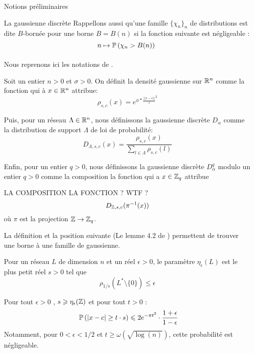 \begin{section}{Notions préliminaires}
\begin{subsection}{La gaussienne discrète}
	Rappellons aussi qu'une famille $\{\chi_n\}_n$ de distributions est dite $B$-bornée pour une borne $B = B(n)$ si la fonction suivante est négligeable :
		\[n \mapsto \PP\left(\chi_n > B(n)\right) \]

	\paragraph{}
	Nous reprenons ici les notations de \cite{STOC:GenPeiVai08}.

	Soit un entier $n > 0$  et $\sigma > 0$. On définit la densité gaussienne sur $\mathbb{R}^n$ comme la fonction qui à $x\in\mathbb{R}^n$ attribue:
	\[\rho_{s,c}(x) = e^{\phi * {\frac{||x-c||}{s}}^2} \]

	Puis, pour un réseau $\Lambda \in \mathbb{R}^n$, nous définissons la gaussienne discrète $D_\alpha$ comme la distribution de support $\Lambda$ de loi de probabilité: 	
	\[ D_{\Lambda, s, c}(x) = \frac{\rho_{s,c}(x)}{\sum_{l\in \Lambda}\rho_{s,c}(l)}\]

	Enfin, pour un entier $q > 0$, nous définissons la gaussienne discrète $D^q_{\alpha}$ modulo un entier $q > 0$ comme la composition la fonction qui a $x \in \mathbb{Z}_q$ attribue 
	
	LA COMPOSITION LA FONCTION ? WTF ?  
		\[ D_{\mathbb{Z}, s, c}(\pi^{-1}(x)) \]
	où $\pi$ est la projection $\mathbb{Z} \rightarrow \mathbb{Z}_q$.

La définition et la position suivante (Le lemme 4.2 de \cite{STOC:GenPeiVai08}) permettent de trouver une borne à une famille de gaussienne.
\begin{definition}
Pour un réseau $L$ de dimension $n$ et un réel $\epsilon > 0$, le paramètre $\eta_\epsilon(L)$ est le plus petit réel $s>0$ tel que 
	\[\rho_{1/s}(L^* \setminus \{0\}) \leqslant \epsilon\]
\end{definition}
	\begin{prop}
	Pour tout $\epsilon > 0$ , $s \geqslant \eta_{\epsilon}(\mathbb{Z})$ et pour tout $t>0$ :
	\[ \PP\left(|x-c| \geq t\cdot s\right) \leqslant 2 e^{-\pi t^2}	\cdot \frac{1+\epsilon}{1-\epsilon} \]
	Notamment, pour $0 < \epsilon  < 1/2$ et $t \geqslant \omega(\sqrt{\log(n)})$, cette probabilité est négligeable.
	\end{prop}
	\end{subsection} %
\end{section}
